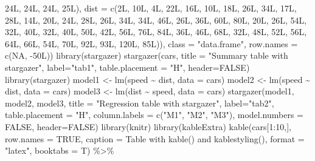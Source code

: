 \documentclass[
  12pt,
]{article}
\newenvironment{Shaded}{\begin{snugshade}}{\end{snugshade}}
\newcommand{\AttributeTok}[1]{\textcolor[rgb]{0.77,0.63,0.00}{#1}}
\newcommand{\ConstantTok}[1]{\textcolor[rgb]{0.00,0.00,0.00}{#1}}
\newcommand{\DecValTok}[1]{\textcolor[rgb]{0.00,0.00,0.81}{#1}}
\newcommand{\FunctionTok}[1]{\textcolor[rgb]{0.00,0.00,0.00}{#1}}
\newcommand{\NormalTok}[1]{#1}
\newcommand{\OtherTok}[1]{\textcolor[rgb]{0.56,0.35,0.01}{#1}}
\newcommand{\SpecialCharTok}[1]{\textcolor[rgb]{0.00,0.00,0.00}{#1}}
\newcommand{\StringTok}[1]{\textcolor[rgb]{0.31,0.60,0.02}{#1}}
\begin{document}
\begin{Shaded}
\begin{Highlighting}[]
\NormalTok{24L, 24L, 24L, 25L), }\AttributeTok{dist =} \FunctionTok{c}\NormalTok{(2L, 10L, 4L, 22L, 16L, 10L, 18L, }
\NormalTok{26L, 34L, 17L, 28L, 14L, 20L, 24L, 28L, 26L, 34L, 34L, 46L, 26L, }
\NormalTok{36L, 60L, 80L, 20L, 26L, 54L, 32L, 40L, 32L, 40L, 50L, 42L, 56L, }
\NormalTok{76L, 84L, 36L, 46L, 68L, 32L, 48L, 52L, 56L, 64L, 66L, 54L, 70L, }
\NormalTok{92L, 93L, 120L, 85L)), }
\AttributeTok{class =} \StringTok{"data.frame"}\NormalTok{, }\AttributeTok{row.names =} \FunctionTok{c}\NormalTok{(}\ConstantTok{NA}\NormalTok{, }
\SpecialCharTok{{-}}\NormalTok{50L))}
\FunctionTok{library}\NormalTok{(stargazer)}
\FunctionTok{stargazer}\NormalTok{(cars, }
          \AttributeTok{title =} \StringTok{"Summary table with stargazer"}\NormalTok{,}
          \AttributeTok{label=}\StringTok{"tab1"}\NormalTok{, }
          \AttributeTok{table.placement =} \StringTok{"H"}\NormalTok{, }
          \AttributeTok{header=}\ConstantTok{FALSE}\NormalTok{)}
\FunctionTok{library}\NormalTok{(stargazer)}
\NormalTok{model1 }\OtherTok{\textless{}{-}} \FunctionTok{lm}\NormalTok{(speed }\SpecialCharTok{\textasciitilde{}}\NormalTok{ dist, }\AttributeTok{data =}\NormalTok{ cars)}
\NormalTok{model2 }\OtherTok{\textless{}{-}} \FunctionTok{lm}\NormalTok{(speed }\SpecialCharTok{\textasciitilde{}}\NormalTok{ dist, }\AttributeTok{data =}\NormalTok{ cars)}
\NormalTok{model3 }\OtherTok{\textless{}{-}} \FunctionTok{lm}\NormalTok{(dist }\SpecialCharTok{\textasciitilde{}}\NormalTok{ speed, }\AttributeTok{data =}\NormalTok{ cars)}
\FunctionTok{stargazer}\NormalTok{(model1, model2, model3,}
          \AttributeTok{title =} \StringTok{"Regression table with stargazer"}\NormalTok{,}
          \AttributeTok{label=}\StringTok{"tab2"}\NormalTok{, }
          \AttributeTok{table.placement =} \StringTok{"H"}\NormalTok{, }
          \AttributeTok{column.labels =} \FunctionTok{c}\NormalTok{(}\StringTok{"M1"}\NormalTok{, }\StringTok{"M2"}\NormalTok{, }\StringTok{"M3"}\NormalTok{),}
          \AttributeTok{model.numbers =} \ConstantTok{FALSE}\NormalTok{,}
          \AttributeTok{header=}\ConstantTok{FALSE}\NormalTok{)}
\FunctionTok{library}\NormalTok{(knitr)}
\FunctionTok{library}\NormalTok{(kableExtra)}
\FunctionTok{kable}\NormalTok{(cars[}\DecValTok{1}\SpecialCharTok{:}\DecValTok{10}\NormalTok{,], }\AttributeTok{row.names =} \ConstantTok{TRUE}\NormalTok{, }
      \AttributeTok{caption =} \StringTok{\textquotesingle{}Table with kable() and kablestyling()\textquotesingle{}}\NormalTok{, }
      \AttributeTok{format =} \StringTok{"latex"}\NormalTok{, }\AttributeTok{booktabs =}\NormalTok{ T) }\SpecialCharTok{\%\textgreater{}\%}

\end{Highlighting}
\end{Shaded}
\end{document}
